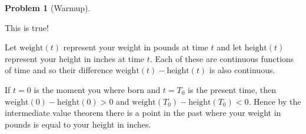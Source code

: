 \documentclass{article}
\theoremstyle{definition}
\newtheorem{Problem}{Problem}
\begin{document}
\begin{Problem}[Warmup]
\begin{itemize}
      \begin{Solution}
        This is true!

        Let $\mathrm{weight}(t)$ represent your weight in pounds at time $t$ and let $\mathrm{height}(t)$ represent your height in inches at time $t$.
        Each of these are continuous functions of time and so their difference $\mathrm{weight}(t) - \mathrm{height}(t)$ is also continuous.

        If $t = 0$ is the moment you where born and $t = T_0$ is the present time, then $\mathrm{weight}(0) - \mathrm{height}(0) > 0$ and $\mathrm{weight}(T_0) - \mathrm{height}(T_0) < 0$.
        Hence by the intermediate value theorem there is a point in the past where your weight in pounds is equal to your height in inches.
      \end{Solution}
  \end{itemize}
\end{Problem}
\end{document}
